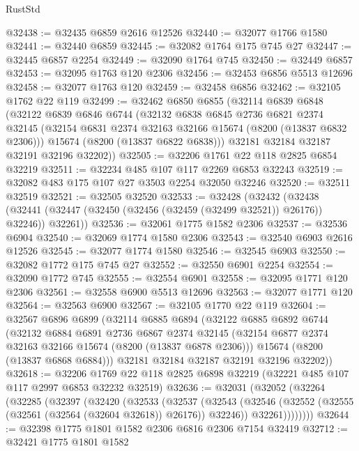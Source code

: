 \begin{lexlean}{RustStd}
\begin{coremodule}
@32438 := @32435 @6859 @2616 @12526
@32440 := @32077 @1766 @1580
@32441 := @32440 @6859
@32445 := @32082 @1764 @175 @745 @27
@32447 := @32445 @6857 @2254
@32449 := @32090 @1764 @745
@32450 := @32449 @6857
@32453 := @32095 @1763 @120 @2306
@32456 := @32453 @6856 @5513 @12696
@32458 := @32077 @1763 @120
@32459 := @32458 @6856
@32462 := @32105 @1762 @22 @119
@32499 := @32462
    @6850
    @6855
    (@32114
      @6839
      @6848
      (@32122
        @6839
        @6846
        @6744
        (@32132
          @6838
          @6845
          @2736
          @6821
          @2374
          @32145
          (@32154 @6831 @2374 @32163 @32166 @15674 (@8200 (@13837 @6832 @2306)))
          @15674
          (@8200 (@13837 @6822 @6838)))
        @32181
        @32184
        @32187
        @32191
        @32196
        @32202))
@32505 := @32206 @1761 @22 @118 @2825 @6854 @32219
@32511 := @32234 @485 @107 @117 @2269 @6853 @32243
@32519 := @32082 @483 @175 @107 @27 @3503 @2254 @32050 @32246
@32520 := @32511 @32519
@32521 := @32505 @32520
@32533 := @32428
    (@32432
      (@32438 (@32441 (@32447 (@32450 (@32456 (@32459 (@32499 @32521)) @26176)) @32246)) @32261))
@32536 := @32061 @1775 @1582 @2306
@32537 := @32536 @6904
@32540 := @32069 @1774 @1580 @2306
@32543 := @32540 @6903 @2616 @12526
@32545 := @32077 @1774 @1580
@32546 := @32545 @6903
@32550 := @32082 @1772 @175 @745 @27
@32552 := @32550 @6901 @2254
@32554 := @32090 @1772 @745
@32555 := @32554 @6901
@32558 := @32095 @1771 @120 @2306
@32561 := @32558 @6900 @5513 @12696
@32563 := @32077 @1771 @120
@32564 := @32563 @6900
@32567 := @32105 @1770 @22 @119
@32604 := @32567
    @6896
    @6899
    (@32114
      @6885
      @6894
      (@32122
        @6885
        @6892
        @6744
        (@32132
          @6884
          @6891
          @2736
          @6867
          @2374
          @32145
          (@32154 @6877 @2374 @32163 @32166 @15674 (@8200 (@13837 @6878 @2306)))
          @15674
          (@8200 (@13837 @6868 @6884)))
        @32181
        @32184
        @32187
        @32191
        @32196
        @32202))
@32618 := @32206 @1769 @22 @118 @2825 @6898 @32219 (@32221 @485 @107 @117 @2997 @6853 @32232 @32519)
@32636 := @32031
    (@32052
      (@32264
        (@32285
          (@32397
            (@32420
              (@32533
                (@32537
                  (@32543
                    (@32546 (@32552 (@32555 (@32561 (@32564 (@32604 @32618)) @26176)) @32246))
                    @32261))))))))
@32644 := @32398 @1775 @1801 @1582 @2306 @6816 @2306 @7154 @32419
@32712 := @32421
    @1775
    @1801
    @1582

\end{coremodule}
\end{lexlean}
